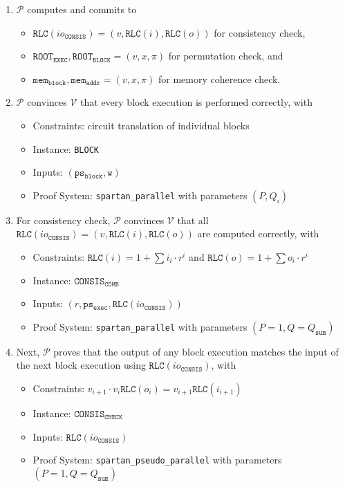 \documentclass{article}
\newcommand{\code}{\texttt}
\newcommand{\Qsum}{Q_{\mathtt{sum}}}
\renewcommand{\P}{\mathcal{P}}
\newcommand{\V}{\mathcal{V}}
\newcommand{\RLC}{\mathtt{RLC}}
\newcommand{\ioc}{io_{\mathtt{CONSIS}}}
\newcommand{\ROOTE}{\mathtt{ROOT_{EXEC}}}
\newcommand{\ROOTB}{\mathtt{ROOT_{BLOCK}}}
\newcommand{\psb}{\mathtt{ps_{block}}}
\newcommand{\pse}{\mathtt{ps_{exec}}}
\newcommand{\memb}{\mathtt{mem_{block}}}
\newcommand{\mema}{\mathtt{mem_{addr}}}
\begin{document}
\begin{enumerate}
    \item $\P$ computes and commits to
    \begin{itemize}
        \item $\RLC(\ioc) = (v, \RLC(i), \RLC(o))$ for consistency check,
        \item $\ROOTE, \ROOTB = (v, x, \pi)$ for permutation check, and
        \item $\memb, \mema = (v, x, \pi)$ for memory coherence check.
    \end{itemize}
    \item $\P$ convinces $\V$ that every block execution is performed correctly, with
    \begin{itemize}
        \item Constraints: circuit translation of individual blocks
        \item Instance: \code{BLOCK}
        \item Inputs: $(\psb, \mathtt{w})$
        \item Proof System: \code{spartan\_parallel} with parameters $(P, Q_i)$
    \end{itemize}
    \item For consistency check, $\P$ convinces $\V$ that all $\RLC(\ioc) = (v, \RLC(i), \RLC(o))$ are computed correctly, with
    \begin{itemize}
        \item Constraints: $\RLC(i) = 1 + \sum i_i\cdot r^i$ and $\RLC(o) = 1 + \sum o_i\cdot r^i$
        \item Instance: $\mathtt{CONSIS}_\mathtt{COMB}$
        \item Inputs: $(r, \pse, \RLC(\ioc))$
        \item Proof System: \code{spartan\_parallel} with parameters $(P = 1, Q = \Qsum)$
    \end{itemize}
    \item Next, $\P$ proves that the output of any block execution matches the input of the next block execution using $\RLC(\ioc)$, with
    \begin{itemize}
        \item Constraints: $v_{i+1}\cdot v_i\RLC(o_i) = v_{i+1}\RLC(i_{i+1})$
        \item Instance: $\mathtt{CONSIS}_\mathtt{CHECK}$
        \item Inputs: $\RLC(\ioc)$
        \item Proof System: \code{spartan\_pseudo\_parallel} with parameters $(P = 1, Q = \Qsum)$
    \end{itemize}

\end{enumerate}
\end{document}
